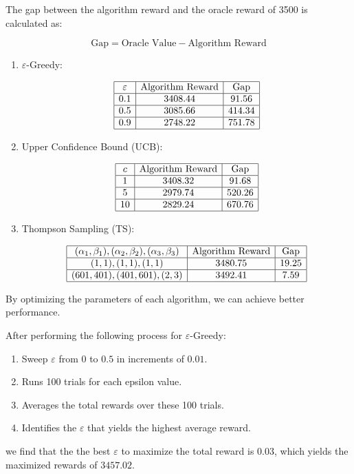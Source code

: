 \documentclass[11pt]{article}
\begin{document}
The gap between the algorithm reward and the oracle reward of 3500 is calculated as:

\[
\text{Gap} = \text{Oracle Value} - \text{Algorithm Reward}
\]

\begin{enumerate}[1.]
  \item \(\varepsilon\)-Greedy:

\[
\begin{array}{|c|c|c|}
\hline
\varepsilon & \text{Algorithm Reward} & \text{Gap} \\
\hline
0.1 & 3408.44 & 91.56 \\
\hline
0.5 & 3085.66 & 414.34 \\
\hline
0.9 & 2748.22 & 751.78 \\
\hline
\end{array}
\]

  \item Upper Confidence Bound (UCB):

\[
\begin{array}{|c|c|c|}
\hline
c & \text{Algorithm Reward} & \text{Gap} \\
\hline
1 & 3408.32 & 91.68 \\
\hline
5 & 2979.74 & 520.26 \\
\hline
10 & 2829.24 & 670.76 \\
\hline
\end{array}
\]

  \item Thompson Sampling (TS):

\[
\begin{array}{|c|c|c|}
\hline
(\alpha_1, \beta_1), (\alpha_2, \beta_2), (\alpha_3, \beta_3) & \text{Algorithm Reward} & \text{Gap} \\
\hline
(1,1), (1,1), (1,1) & 3480.75 & 19.25 \\
\hline
(601,401), (401,601), (2,3) & 3492.41 & 7.59 \\
\hline
\end{array}
\]
\end{enumerate}

\newpage
By optimizing the parameters of each algorithm, we can achieve better performance. 

After performing the following process for $\varepsilon$-Greedy:
\begin{enumerate}
  \item Sweep $\varepsilon$ from $0$ to $0.5$ in increments of $0.01$.
  \item Runs 100 trials for each epsilon value.
  \item Averages the total rewards over these 100 trials.
  \item Identifies the $\varepsilon$ that yields the highest average reward.
\end{enumerate}
we find that the the best $\varepsilon$ to maximize the total reward is $0.03$, which yields the maximized rewards of $3457.02$.
\end{document}
